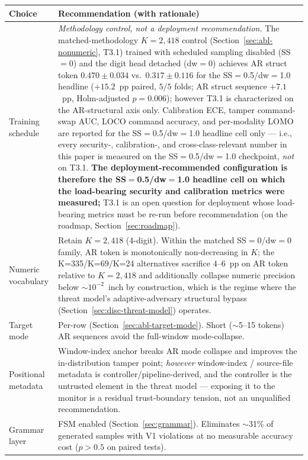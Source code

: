 \documentclass[sensors,article,submit,moreauthors,pdftex]{Definitions/mdpi}
\begin{document}
\begin{center}
\small
\begin{tabular}{p{} p{}}
\toprule
\textbf{Choice} & \textbf{Recommendation (with rationale)} \\
\midrule
Training schedule & \emph{Methodology control, not a deployment recommendation.} The matched-methodology $K\!=\!2{,}418$ control (Section~\ref{sec:abl-nonumeric}, T3.1) trained with scheduled sampling disabled (SS$=$0) and the digit head detached (dw$=$0) achieves AR struct token $0.470 \pm 0.034$ vs.\ $0.317 \pm 0.116$ for the SS$=$0.5/dw$=$1.0 headline ($+15.2$~pp paired, $5/5$ folds; AR struct sequence $+7.1$~pp, Holm-adjusted $p\!=\!0.006$); however T3.1 is characterized on the AR-structural axis only. Calibration ECE, tamper command-swap AUC, LOCO command accuracy, and per-modality LOMO are reported for the SS$=$0.5/dw$=$1.0 headline cell only --- i.e., every security-, calibration-, and cross-class-relevant number in this paper is measured on the SS$=$0.5/dw$=$1.0 checkpoint, \emph{not} on T3.1. \textbf{The deployment-recommended configuration is therefore the SS$=$0.5/dw$=$1.0 headline cell on which the load-bearing security and calibration metrics were measured;} T3.1 is an open question for deployment whose load-bearing metrics must be re-run before recommendation (on the roadmap, Section~\ref{sec:roadmap}). \\
Numeric vocabulary & Retain $K\!=\!2{,}418$ (4-digit). Within the matched SS$=$0/dw$=$0 family, AR token is monotonically non-decreasing in $K$; the K=335/K=69/K=24 alternatives sacrifice $4$--$6$~pp on AR token relative to $K\!=\!2{,}418$ and additionally collapse numeric precision below ${\sim}10^{-2}$~inch by construction, which is the regime where the threat model's adaptive-adversary structural bypass (Section~\ref{sec:disc-threat-model}) operates. \\
Target mode & Per-row (Section~\ref{sec:abl-target-mode}). Short ($\sim$5--15 tokens) AR sequences avoid the full-window mode-collapse. \\
Positional metadata & Window-index anchor breaks AR mode collapse and improves the in-distribution tamper point; \emph{however} window-index / source-file metadata is controller/pipeline-derived, and the controller is the untrusted element in the threat model --- exposing it to the monitor is a residual trust-boundary tension, not an unqualified recommendation. \\
Grammar layer & FSM enabled (Section~\ref{sec:grammar}). Eliminates $\sim$31\% of generated samples with V1 violations at no measurable accuracy cost ($p > 0.5$ on paired tests). \\

\end{tabular}
\end{center}
\end{document}
